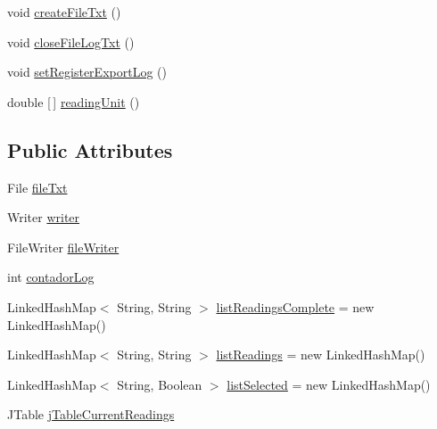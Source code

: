 \begin{DoxyCompactItemize}
void \hyperlink{classcom_1_1eneri_1_1scorpio__metertool_1_1ui_1_1_current_readings_records_a7deeff6260ce4e1e9788955a3008349f}{create\+File\+Txt} ()
\item 
void \hyperlink{classcom_1_1eneri_1_1scorpio__metertool_1_1ui_1_1_current_readings_records_a59b8313e0fe66a17f88b767de7572563}{close\+File\+Log\+Txt} ()
\item 
void \hyperlink{classcom_1_1eneri_1_1scorpio__metertool_1_1ui_1_1_current_readings_records_a7890454cf239621365e1c1a40365a1d8}{set\+Register\+Export\+Log} ()
\item 
double \mbox{[}$\,$\mbox{]} \hyperlink{classcom_1_1eneri_1_1scorpio__metertool_1_1ui_1_1_current_readings_records_a560ea307a3fd7aa9679f56768836416f}{reading\+Unit} ()
\end{DoxyCompactItemize}
\subsection*{Public Attributes}
\begin{DoxyCompactItemize}
\item 
File \hyperlink{classcom_1_1eneri_1_1scorpio__metertool_1_1ui_1_1_current_readings_records_a551d944f4040ef9c550eba5679e0a4e9}{file\+Txt}
\item 
Writer \hyperlink{classcom_1_1eneri_1_1scorpio__metertool_1_1ui_1_1_current_readings_records_ac019fdec9daa77312bbfce0eeee96117}{writer}
\item 
File\+Writer \hyperlink{classcom_1_1eneri_1_1scorpio__metertool_1_1ui_1_1_current_readings_records_a61adfcd882616a17e0b651ad150bcd30}{file\+Writer}
\item 
int \hyperlink{classcom_1_1eneri_1_1scorpio__metertool_1_1ui_1_1_current_readings_records_ae45194405ee117b01ffcc3b735ad2fb1}{contador\+Log}
\item 
Linked\+Hash\+Map$<$ String, String $>$ \hyperlink{classcom_1_1eneri_1_1scorpio__metertool_1_1ui_1_1_current_readings_records_a19774c496fb5c186f128ed2a16b3b43a}{list\+Readings\+Complete} = new Linked\+Hash\+Map()
\item 
Linked\+Hash\+Map$<$ String, String $>$ \hyperlink{classcom_1_1eneri_1_1scorpio__metertool_1_1ui_1_1_current_readings_records_a13517d1ec042eeb3b9ada9b9a2f6c301}{list\+Readings} = new Linked\+Hash\+Map()
\item 
Linked\+Hash\+Map$<$ String, Boolean $>$ \hyperlink{classcom_1_1eneri_1_1scorpio__metertool_1_1ui_1_1_current_readings_records_a86d9f6c41a46bb858fd562100fc91f1c}{list\+Selected} = new Linked\+Hash\+Map()
\item 
J\+Table \hyperlink{classcom_1_1eneri_1_1scorpio__metertool_1_1ui_1_1_current_readings_records_adec1d5c0692a677cec150217d8f0d491}{j\+Table\+Current\+Readings}
\end{DoxyCompactItemize}
